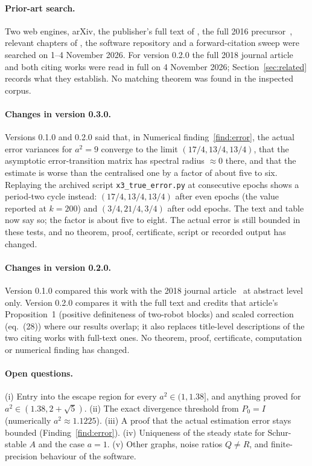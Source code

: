 \documentclass[11pt,a4paper]{article}
\numberwithin{equation}{section}
\theoremstyle{remark}\newtheorem{remark}[theorem]{Remark}
\begin{document}
\paragraph{Prior-art search.} Two web engines, arXiv, the publisher's full text of
\citep{JungLuftWeiss2025}, the full 2016 precursor~\citep{Luft2016}, relevant chapters of
\citep{Jung2023thesis}, the software repository and a forward-citation sweep were searched on
1--4 November 2026. For version 0.2.0 the full 2018 journal article~\citep{Luft2018} and both
citing works were read in full on 4 November 2026; Section~\ref{sec:related} records what they
establish. No matching theorem was found in the inspected corpus.

\paragraph{Changes in version 0.3.0.} Versions 0.1.0 and 0.2.0 said that, in Numerical
finding~\ref{find:error}, the actual error variances for $a^2=9$ converge to the limit
$(17/4,13/4,13/4)$, that the asymptotic error-transition matrix has spectral radius $\approx0$
there, and that the estimate is worse than the centralised one by a factor of about five to six.
Replaying the archived script \texttt{x3\_true\_error.py} at consecutive epochs shows a period-two
cycle instead: $(17/4,13/4,13/4)$ after even epochs (the value reported at $k=200$) and
$(3/4,21/4,3/4)$ after odd epochs. The text and table now say so; the factor is about five to
eight. The actual error is still bounded in these tests, and no theorem, proof, certificate,
script or recorded output has changed.

\paragraph{Changes in version 0.2.0.} Version 0.1.0 compared this work with the 2018 journal
article~\citep{Luft2018} at abstract level only. Version 0.2.0 compares it with the full text and
credits that article's Proposition~1 (positive definiteness of two-robot blocks) and scaled
correction (eq.~(28)) where our results overlap; it also replaces title-level descriptions of the
two citing works with full-text ones. No theorem, proof, certificate, computation or numerical
finding has changed.

\paragraph{Open questions.}
(i) Entry into the escape region for every $a^2\in(1,1.38]$, and anything proved for
$a^2\in(1.38,2+\sqrt5)$. (ii) The exact divergence threshold from $P_0=I$ (numerically
$a^2\approx1.1225$). (iii) A proof that the actual estimation error stays bounded
(Finding~\ref{find:error}). (iv) Uniqueness of the steady state for Schur-stable $A$ and the
case $a=1$. (v) Other graphs, noise ratios $Q\ne R$, and finite-precision behaviour of the
software.
\end{document}
